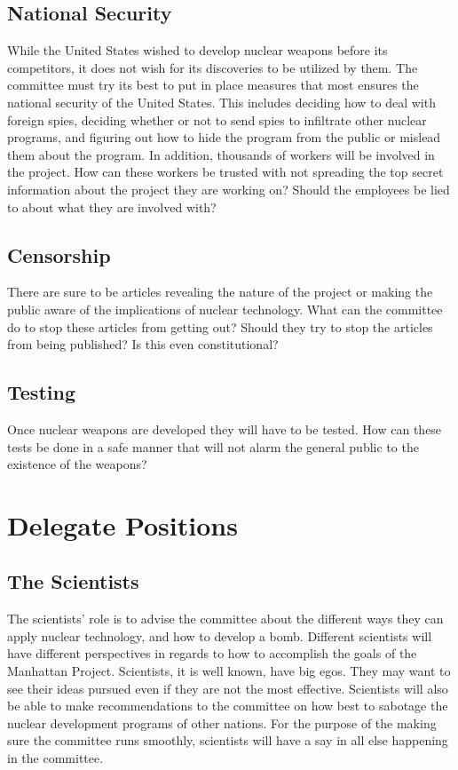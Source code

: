 \documentclass[11 pt, twoside]{article}
\begin{document}
\subsection{National Security}
While the United States wished to develop nuclear weapons before its competitors, it does not wish for its discoveries to be utilized by them. The committee must try its best to put in place measures that most ensures the national security of the United States. This includes deciding how to deal with foreign spies, deciding  whether or not to send spies to infiltrate other nuclear programs, and figuring out how to hide the program from the public or mislead them about the program. In addition, thousands of workers will be involved in the project. How can these workers be trusted with not spreading the top secret information about the project they are working on? Should the employees be lied to about what they are involved with?

\subsection{Censorship}
There are sure to be articles revealing the nature of the project or making the public aware of the implications of nuclear technology. What can the committee do to stop these articles from getting out? Should they try to stop the articles from being published? Is this even constitutional? 

\subsection{Testing}
Once nuclear weapons are developed they will have to be tested. How can these tests be done in a safe manner that will not alarm the general public to the existence of the weapons?

\section{Delegate Positions}

\subsection{The Scientists}
The scientists’ role is to advise the committee about the different ways they can apply nuclear technology, and how to develop a bomb. Different scientists will have different perspectives in regards to how to accomplish the goals of the Manhattan Project. Scientists, it is well known, have big egos. They may want to see their ideas pursued even if they are not the most effective. Scientists will also be able to make recommendations to the committee on how best to sabotage the nuclear development programs of other nations. For the purpose of the making sure the committee runs smoothly, scientists will  have a say in all else happening in the committee.
\end{document}
